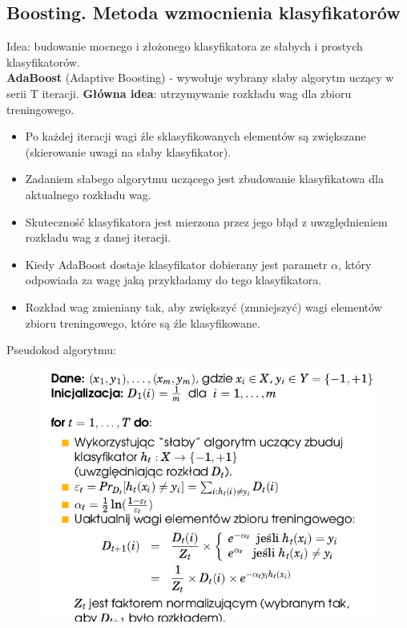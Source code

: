 \documentclass[10pt,a4paper]{article}
\begin{document}
\subsection{Boosting. Metoda wzmocnienia klasyfikatorów}
Idea: budowanie mocnego i złożonego klasyfikatora ze słabych i prostych klasyfikatorów. \\
\textbf{AdaBoost} (Adaptive Boosting) - wywołuje wybrany słaby algorytm uczący w serii T iteracji. \textbf{Główna idea}: utrzymywanie rozkładu wag dla zbioru treningowego.
\begin{itemize}
  \item Po każdej iteracji wagi źle sklasyfikowanych elementów są zwiększane (skierowanie uwagi na słaby klasyfikator).
  \item Zadaniem słabego algorytmu uczącego jest zbudowanie klasyfikatowa dla aktualnego rozkładu wag.
  \item Skuteczność klasyfikatora jest mierzona przez jego błąd z uwzględnieniem rozkładu wag z danej iteracji.
  \item Kiedy AdaBoost dostaje klasyfikator dobierany jest parametr $\alpha$, który odpowiada za wagę jaką przykładamy do tego klasyfikatora.
  \item Rozkład wag zmieniany tak, aby zwiększyć (zmniejszyć) wagi elementów zbioru treningowego, które są źle klasyfikowane. \\
\end{itemize}
Pseudokod algorytmu:
\begin{figure}[H]
  \centering
    \includegraphics[scale=0.50]{images/pseudo.png}
\end{figure}
\end{document}

